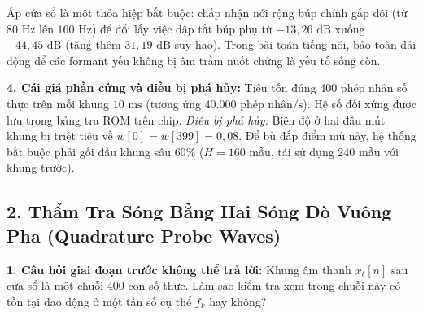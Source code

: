 \documentclass[11pt,a4paper]{article}
\begin{document}
\begin{physicalinsight}
Áp cửa sổ là một thỏa hiệp bắt buộc: chấp nhận nới rộng búp chính gấp đôi (từ $80\text{ Hz}$ lên $160\text{ Hz}$) để đổi lấy việc dập tắt búp phụ từ $-13{,}26\text{ dB}$ xuống $-44{,}45\text{ dB}$ (tăng thêm $31{,}19\text{ dB}$ suy hao). Trong bài toán tiếng nói, bảo toàn dải động để các formant yếu không bị âm trầm nuốt chửng là yếu tố sống còn.
\end{physicalinsight}

\textbf{4. Cái giá phần cứng và điều bị phá hủy:} Tiêu tốn đúng 400 phép nhân số thực trên mỗi khung $10\text{ ms}$ (tương ứng $40.000\text{ phép nhân/s}$). Hệ số đối xứng được lưu trong bảng tra ROM trên chip. \textit{Điều bị phá hủy:} Biên độ ở hai đầu mút khung bị triệt tiêu về $w[0] = w[399] = 0{,}08$. Để bù đắp điểm mù này, hệ thống bắt buộc phải gối đầu khung sâu $60\%$ ($H = 160$ mẫu, tái sử dụng 240 mẫu với khung trước).

\clearpage


\subsection*{2. Thẩm Tra Sóng Bằng Hai Sóng Dò Vuông Pha (Quadrature Probe Waves)}

\textbf{1. Câu hỏi giai đoạn trước không thể trả lời:} Khung âm thanh $x_\ell[n]$ sau cửa sổ là một chuỗi 400 con số thực. Làm sao kiểm tra xem trong chuỗi này có tồn tại dao động ở một tần số cụ thể $f_k$ hay không?
\end{document}
